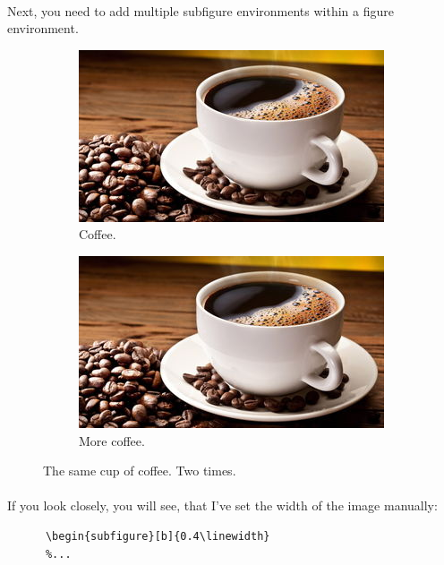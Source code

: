     \paragraph{ }
      Next, you need to add multiple subfigure environments within a figure environment.
    \begin{figure}[h!]
      \centering
      \begin{subfigure}[b]{0.4\linewidth}
        \includegraphics[width=\linewidth]{graphics/coffee.jpg}
        \caption{Coffee.}
      \end{subfigure}
      \begin{subfigure}[b]{0.4\linewidth}
        \includegraphics[width=\linewidth]{graphics/coffee.jpg}
        \caption{More coffee.}
      \end{subfigure}
      \caption{The same cup of coffee. Two times.}
      \label{fig:coffee}
    \end{figure}

    \paragraph{ }
    If you look closely, you will see, that I've set the width of the image manually:
    \begin{lstlisting}[language={[LaTeX]TeX}, breaklines=true,frame=single]
      %...
      \begin{subfigure}[b]{0.4\linewidth}
      %...
    \end{lstlisting}

